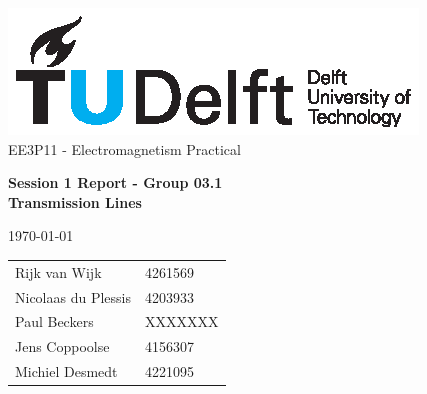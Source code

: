 \documentclass[11pt, a4paper, oneside]{article}
\begin{document}
\noindent
\begin{center}
	\includegraphics[width=\columnwidth]{tudelftlogo.eps} \\
	
	EE3P11 - Electromagnetism Practical\\
	\begin{LARGE}
		\textbf{Session 1 Report - Group 03.1 \\ Transmission Lines} \\[0.3cm]
	\end{LARGE}
	\today \\[.2cm]
	\begin{tabular}{l l}
		Rijk van Wijk & 4261569 \\
		Nicolaas du Plessis & 4203933 \\
		Paul Beckers & XXXXXXX \\
		Jens Coppoolse & 4156307 \\
		Michiel Desmedt & 4221095 \\
		
	\end{tabular}
\end{center}

	
	
	
	
	
\end{document}
